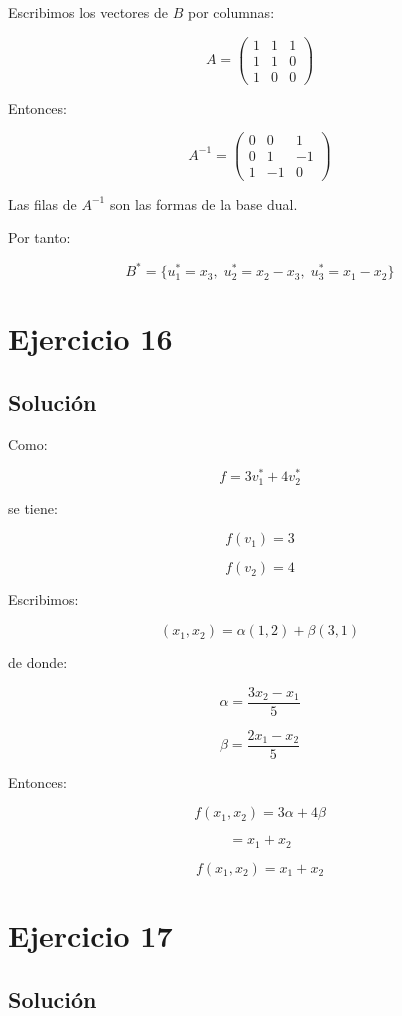 \documentclass[11pt,a4paper]{article}
\begin{document}
	Escribimos los vectores de $B$ por columnas:

	\[
	A=
	\begin{pmatrix}
	1&1&1\\
	1&1&0\\
	1&0&0
	\end{pmatrix}
	\]

	Entonces:

	\[
	A^{-1}
	=
	\begin{pmatrix}
	0&0&1\\
	0&1&-1\\
	1&-1&0
	\end{pmatrix}
	\]

	Las filas de $A^{-1}$ son las formas de la base dual.

	Por tanto:

	\[
	\boxed{
	B^*
	=
	\{
	u_1^*=x_3,\;
	u_2^*=x_2-x_3,\;
	u_3^*=x_1-x_2
	\}
	}
	\]

\section{Ejercicio 16}
	\subsection{Solución}

	Como:

	\[
	f=3v_1^*+4v_2^*
	\]

	se tiene:

	\[
	f(v_1)=3
	\]

	\[
	f(v_2)=4
	\]

	Escribimos:

	\[
	(x_1,x_2)
	=
	\alpha(1,2)+\beta(3,1)
	\]

	de donde:

	\[
	\alpha
	=
	\frac{3x_2-x_1}{5}
	\]

	\[
	\beta
	=
	\frac{2x_1-x_2}{5}
	\]

	Entonces:

	\[
	f(x_1,x_2)
	=
	3\alpha+4\beta
	\]

	\[
	=
	x_1+x_2
	\]

	\[
	\boxed{
	f(x_1,x_2)=x_1+x_2
	}
	\]

\section{Ejercicio 17}
	\subsection{Solución}
\end{document}
